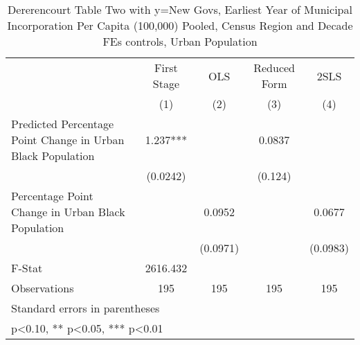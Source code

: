 \begin{table}[htbp]\centering
\def\sym#1{\ifmmode^{#1}\else\(^{#1}\)\fi}
\caption{Dererencourt Table Two with y=New Govs, Earliest Year of Municipal Incorporation Per Capita (100,000) Pooled, Census Region and Decade FEs controls, Urban Population}
\begin{tabular}{l*{4}{c}}
\toprule
                    & First Stage   &         OLS   &Reduced Form   &        2SLS   \\
                    &\multicolumn{1}{c}{(1)}   &\multicolumn{1}{c}{(2)}   &\multicolumn{1}{c}{(3)}   &\multicolumn{1}{c}{(4)}   \\
\midrule
Predicted Percentage Point Change in Urban Black Population&       1.237***&               &      0.0837   &               \\
                    &    (0.0242)   &               &     (0.124)   &               \\
\addlinespace
Percentage Point Change in Urban Black Population&               &      0.0952   &               &      0.0677   \\
                    &               &    (0.0971)   &               &    (0.0983)   \\
\midrule
F-Stat              &    2616.432   &               &               &               \\
Observations        &         195   &         195   &         195   &         195   \\
\bottomrule
\multicolumn{5}{l}{\footnotesize Standard errors in parentheses}\\
\multicolumn{5}{l}{\footnotesize * p<0.10, ** p<0.05, *** p<0.01}\\
\end{tabular}
\end{table}
